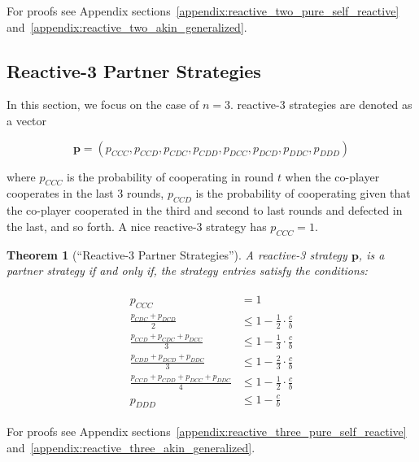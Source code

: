 \documentclass[11pt]{article}
\theoremstyle{plainCl1}
\newtheorem{theorem}{Theorem}[section]
\theoremstyle{plainCl2}
\begin{document}
For proofs see Appendix sections~\ref{appendix:reactive_two_pure_self_reactive}
and~\ref{appendix:reactive_two_akin_generalized}.


\subsection{Reactive-3 Partner Strategies}\label{section:reactive_three_partner_strategies}

In this section, we focus on the case of $n=3$. reactive-3 strategies are
denoted as a vector 

$$\mathbf{p}=(p_{CCC}, p_{CCD}, p_{CDC}, p_{CDD}, p_{DCC}, p_{DCD}, p_{DDC}, p_{DDD})$$

where $p_{CCC}$ is the probability of cooperating in round $t$ when the
co-player cooperates in the last 3 rounds, $p_{CCD}$ is the probability of
cooperating given that the co-player cooperated in the third and second to last
rounds and defected in the last, and so forth. A nice reactive-3 strategy
has $p_{CCC} = 1$.

\begin{theorem}[``Reactive-3 Partner Strategies'']\label{theorem:reactive_three_partner_strategies}
A reactive-3 strategy $\mathbf{p}$, is a partner strategy if and only if,
the strategy entries satisfy the conditions:

\begin{align}\label{eq:three_bit_conditions}
  \begin{split}
  p_{CCC} & = 1 \\
  \frac{p_{CDC} + p_{DCD}}{2} & \leq 1 - \frac{1}{2} \cdot \frac{c}{b} \\
  \frac{p_{CCD} + p_{CDC} + p_{DCC}}{3} & \leq 1 - \frac{1}{3} \cdot \frac{c}{b} \\
  \frac{p_{CDD} + p_{DCD} + p_{DDC}}{3} & \leq 1 - \frac{2}{3} \cdot \frac{c}{b} \\
  \frac{p_{CCD} + p_{CDD} + p_{DCC} + p_{DDC}}{4}  & \leq 1 - \frac{1}{2} \cdot \frac{c}{b}  \\
  p_{DDD} & \leq 1\!-\! \frac{c}{b}
  \end{split}
\end{align}
\end{theorem}

For proofs see Appendix sections~\ref{appendix:reactive_three_pure_self_reactive}
and~\ref{appendix:reactive_three_akin_generalized}.

\end{document}
